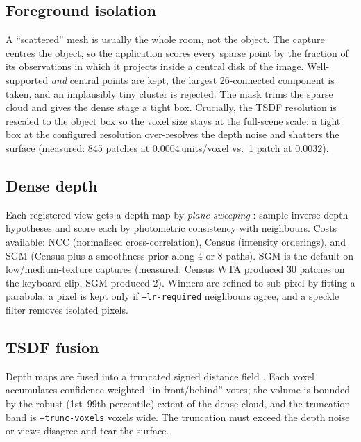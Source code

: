 \documentclass[11pt,a4paper]{article}
\newcommand{\code}[1]{\texttt{#1}}
\begin{document}
\subsection{Foreground isolation}
\label{sec:isolation}

A ``scattered'' mesh is usually the whole room, not the object. The capture centres the object,
so the application scores every sparse point by the fraction of its observations in which it
projects inside a central disk of the image. Well-supported \emph{and} central points are kept,
the largest 26-connected component is taken, and an implausibly tiny cluster is rejected. The
mask trims the sparse cloud and gives the dense stage a tight box. Crucially, the TSDF
resolution is rescaled to the object box so the voxel size stays at the full-scene scale: a
tight box at the configured resolution over-resolves the depth noise and shatters the surface
(measured: 845 patches at $0.0004$\,units/voxel vs.\ 1 patch at $0.0032$).

\subsection{Dense depth}
\label{sec:dense}

Each registered view gets a depth map by \emph{plane sweeping} \cite{collins1996}: sample
inverse-depth hypotheses and score each by photometric consistency with neighbours. Costs
available: NCC (normalised cross-correlation), Census \cite{zabih1994} (intensity orderings),
and SGM \cite{hirschmuller2008} (Census plus a smoothness prior along 4 or 8 paths). SGM is the
default on low/medium-texture captures (measured: Census WTA produced 30 patches on the
keyboard clip, SGM produced 2). Winners are refined to sub-pixel by fitting a parabola, a
pixel is kept only if \code{--lr-required} neighbours agree, and a speckle filter removes
isolated pixels.

\subsection{TSDF fusion}
\label{sec:tsdf}

Depth maps are fused into a truncated signed distance field \cite{curless1996,newcombe2011}.
Each voxel accumulates confidence-weighted ``in front/behind'' votes; the volume is bounded by
the robust (1st--99th percentile) extent of the dense cloud, and the truncation band is
\code{--trunc-voxels} voxels wide. The truncation must exceed the depth noise or views disagree
and tear the surface.
\end{document}
